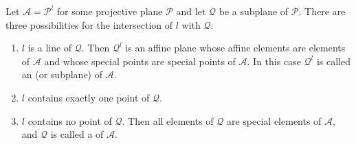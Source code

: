 Let $\mathcal{A} = \mathcal{P}^l$ for some projective plane $\mathcal{P}$ and let $\mathcal{Q}$ be a subplane of $\mathcal{P}$. There are three possibilities for the intersection of $l$ with $\mathcal{Q}$:
\begin{enumerate}
\item[(a)] $l$ is a line of $\mathcal{Q}$. Then $\mathcal{Q}^l$ is an affine plane whose affine elements are elements of $\mathcal{A}$ and whose special points are special points of $\mathcal{A}$. In this case $\mathcal{Q}^l$ is called an  (or subplane) of $\mathcal{A}$.
\item[(b)] $l$ contains exactly one point of $\mathcal{Q}$.
\item[(c)] $l$ contains no point of $\mathcal{Q}$. Then all elements of $\mathcal{Q}$ are special elements of $\mathcal{A}$, and $\mathcal{Q}$ is called a  of $\mathcal{A}$.
\end{enumerate}
